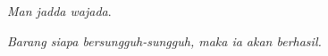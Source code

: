 \documentclass{skripsistatugm}
\begin{document}
\cover\titlepage

\approvalpage
\declarepage

\acknowledment
\begin{flushright}
\Large\emph{}
\end{flushright}


\motto
\begin{flushleft}
\Large\emph\cal\textit{Man jadda wajada}.
\end{flushleft}
\textit{Barang siapa bersungguh-sungguh, maka ia akan berhasil.}


\end{document}
